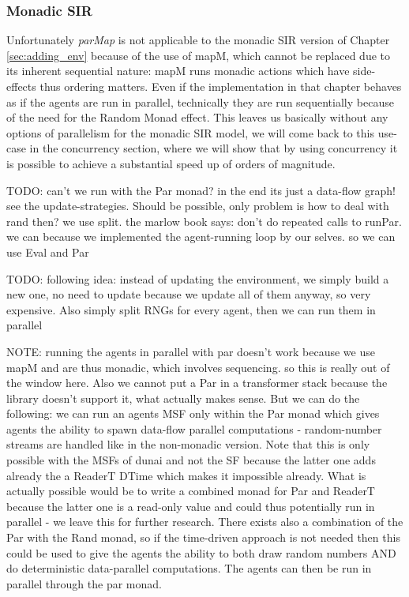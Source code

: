 \subsubsection{Monadic SIR}
Unfortunately \textit{parMap} is not applicable to the monadic SIR version of Chapter \ref{sec:adding_env} because of the use of mapM, which cannot be replaced due to its inherent sequential nature: mapM runs monadic actions which have side-effects thus ordering matters. Even if the implementation in that chapter behaves as if the agents are run in parallel, technically they are run sequentially because of the need for the Random Monad effect. This leaves us basically without any options of parallelism for the monadic SIR model, we will come back to this use-case in the concurrency section, where we will show that by using concurrency it is possible to achieve a substantial speed up of orders of magnitude.

TODO: can't we run with the Par monad? in the end its just a data-flow graph! see the update-strategies. Should be possible, only problem is how to deal with rand then? we use split. the marlow book says: don't do repeated calls to runPar. we can because we implemented the agent-running loop  by our selves. so we can use Eval and Par

TODO: following idea: instead of updating the environment, we simply build a new one, no need to update because we update all of them anyway, so very expensive. Also simply split RNGs for every agent, then we can run them in parallel 


NOTE: running the agents in parallel with par doesn't work because we use mapM and are thus monadic, which involves sequencing. so this is really out of the window here. Also we cannot put a Par in a transformer stack because the library doesn't support it, what actually makes sense. But we can do the following: we can run an agents MSF only within the Par monad which gives agents the ability to spawn data-flow parallel computations - random-number streams are handled like in the non-monadic version. Note that this is only possible with the MSFs of dunai and not the SF because the latter one adds already the a ReaderT DTime which makes it impossible already. 
What is actually possible would be to write a combined monad for Par and ReaderT because the latter one is a read-only value and could thus potentially run in parallel - we leave this for further research. There exists also a combination of the Par with the Rand monad, so if the time-driven approach is not needed then this could be used to give the agents the ability to both draw random numbers AND do deterministic data-parallel computations. The agents can then be run in parallel through the par monad.


